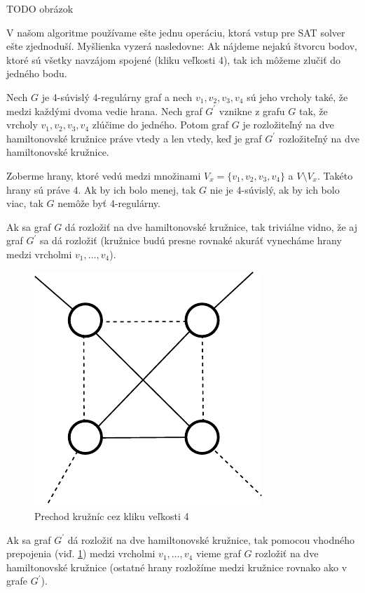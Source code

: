 TODO obrázok



\medskip

V našom algoritme používame ešte jednu operáciu, ktorá vstup pre SAT solver ešte zjednoduší.
Myšlienka vyzerá nasledovne: Ak nájdeme nejakú štvorcu bodov, ktoré sú všetky navzájom spojené
(kliku veľkosti 4), tak
ich môžeme zlučiť do jedného bodu.

\begin{veta}
Nech $G$ je 4-súvislý 4-regulárny graf a nech $v_1, v_2, v_3, v_4$ sú jeho vrcholy také, že medzi
každými dvoma vedie hrana. Nech graf $G^{'}$ vznikne z grafu $G$ tak, že vrcholy $v_1, v_2, v_3,
v_4$ zlúčime do jedného. Potom graf $G$ je rozložiteľný na dve hamiltonovské kružnice práve vtedy a
len vtedy, keď je graf $G^{'}$ rozložiteľný na dve hamiltonovské kružnice.
\end{veta}

\begin{dokaz}
Zoberme hrany, ktoré vedú medzi množinami $V_x = \{v_1, v_2, v_3, v_4\}$ a $V \setminus V_x$.
Takéto hrany sú práve 4. Ak by ich bolo menej, tak $G$ nie je 4-súvislý, ak by ich bolo viac, tak
$G$ nemôže byť 4-regulárny.

Ak sa graf $G$ dá rozložiť na dve hamiltonovské kružnice, tak triviálne vidno, že aj graf $G^{'}$ sa
dá rozložiť (kružnice budú presne rovnaké akuráť vynecháme hrany medzi vrcholmi $v_1, \dots, v_4$).

\begin{figure}[h]
\centering
\includegraphics[scale=0.5]{img/k4.pdf}
\caption{Prechod kružníc cez kliku veľkosti 4}
\label{fig:k4}
\end{figure}

Ak sa graf $G^{'}$ dá rozložiť na dve hamiltonovské kružnice, tak pomocou vhodného prepojenia (viď.
\ref{fig:k4}) medzi
vrcholmi $v_1, \dots, v_4$ vieme graf $G$ rozložiť na dve hamiltonovské kružnice (ostatné hrany
rozložíme medzi kružnice rovnako ako v grafe $G^{'}$).
\end{dokaz}


